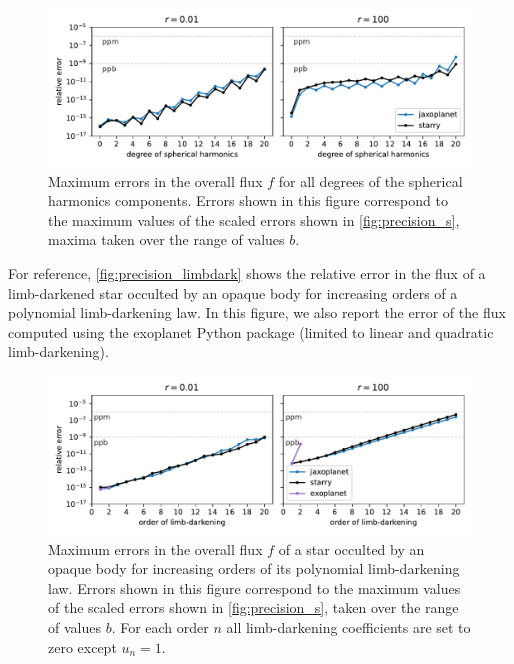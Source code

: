 \documentclass[modern]{aastex631}
\begin{document}
\begin{figure}[H]
    \begin{center}
        \includegraphics[width=\textwidth]{../workflows/precision/figures/error_degree.pdf}
        \caption{Maximum errors in the overall flux $f$ for all degrees of the spherical harmonics components. Errors shown in this figure correspond to the maximum values of the scaled errors shown in \autoref{fig:precision_s}, maxima taken over the range of values $b$. }
        \label{fig:precision_degree}
    \end{center}
\end{figure}
For reference, \autoref{fig:precision_limbdark} shows the relative error in the flux of a limb-darkened star occulted by an opaque body for increasing orders of a polynomial limb-darkening law. In this figure, we also report the error of the flux computed using the \textsf{exoplanet} Python package (limited to linear and quadratic limb-darkening).
\begin{figure}[H]
    \begin{center}
        \includegraphics[width=\textwidth]{../workflows/precision/figures/limbdark_error.PDF}
        \caption{Maximum errors in the overall flux $f$ of a star occulted by an opaque body for increasing orders of its polynomial limb-darkening law. Errors shown in this figure correspond to the maximum values of the scaled errors shown in \autoref{fig:precision_s}, taken over the range of values $b$. For each order $n$ all limb-darkening coefficients are set to zero except $u_n=1$. }
        \label{fig:precision_limbdark}
    \end{center}
\end{figure}
\end{document}

